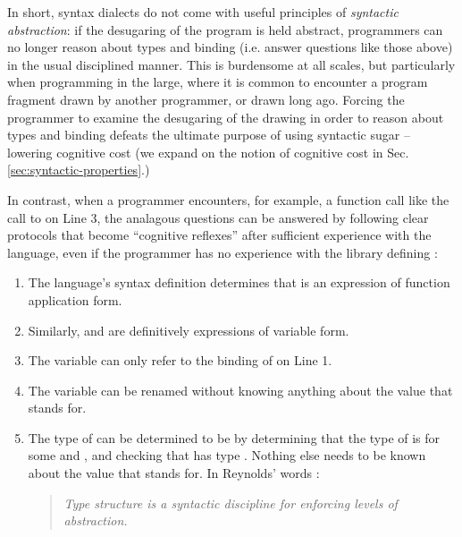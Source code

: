 In short, syntax dialects do not come with useful principles of \emph{syntactic abstraction}: if the desugaring of the program is held abstract, programmers can no longer reason about types and binding (i.e. answer questions like those above) in the usual disciplined manner. This is burdensome at all scales, but particularly when programming in the large, where it is common to encounter a program fragment drawn by another programmer, or drawn  long ago. Forcing the programmer to examine the desugaring of the drawing in order to reason about types and binding defeats the ultimate purpose of using syntactic sugar -- lowering cognitive cost (we expand on the notion of cognitive cost in Sec. \ref{sec:syntactic-properties}.)



In contrast, when a programmer encounters, for example, a function call like the call to  on Line 3, the analagous questions can be answered by following clear protocols that become ``cognitive reflexes'' after sufficient experience with the language, even if the programmer has no experience with the library defining :
\begin{enumerate}
\item The language's syntax definition determines that  is an expression of function application form.
\item Similarly,  and  are definitively expressions of variable form.
\item The variable  can only refer to the binding of  on Line 1.
\item The variable  can be renamed without knowing anything about the value that  stands for.
\item The type of  can be determined to be  by determining that the type of  is  for some  and , and checking that  has type . Nothing else needs to be known about the value that  stands for. In Reynolds' words \cite{B304}:
\begin{quote}
\emph{Type structure is a syntactic discipline for enforcing levels of abstraction.}
\end{quote}
\end{enumerate}

